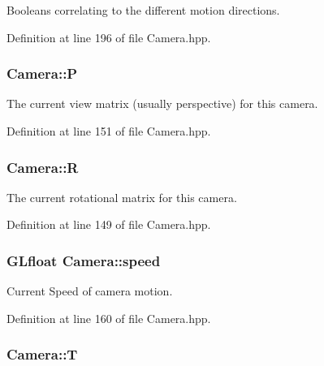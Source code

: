 Booleans correlating to the different motion directions. 



Definition at line 196 of file Camera.\-hpp.

\hypertarget{class_camera_a0bee6fbae6ec5960850a5fb858f3912a}{
\subsubsection[{P}]{ Camera\-::\-P\hspace{0.3cm}{\ttfamily [private]}}}\label{class_camera_a0bee6fbae6ec5960850a5fb858f3912a}


The current view matrix (usually perspective) for this camera. 



Definition at line 151 of file Camera.\-hpp.

\hypertarget{class_camera_a8fd028120b18556c43ad86756e637fbc}{
\subsubsection[{R}]{ Camera\-::\-R\hspace{0.3cm}{\ttfamily [private]}}}\label{class_camera_a8fd028120b18556c43ad86756e637fbc}


The current rotational matrix for this camera. 



Definition at line 149 of file Camera.\-hpp.

\hypertarget{class_camera_a308e92b5d3ef0eea5cac7745df6e28f4}{
\subsubsection[{speed}]{\setlength{\rightskip}{0pt plus 5cm}G\-Lfloat Camera\-::speed\hspace{0.3cm}{\ttfamily [private]}}}\label{class_camera_a308e92b5d3ef0eea5cac7745df6e28f4}


Current Speed of camera motion. 



Definition at line 160 of file Camera.\-hpp.

\hypertarget{class_camera_aa4cb92b539c9a9707a12d7025ed889f6}{
\subsubsection[{T}]{ Camera\-::\-T\hspace{0.3cm}{\ttfamily [private]}}}\label{class_camera_aa4cb92b539c9a9707a12d7025ed889f6}


